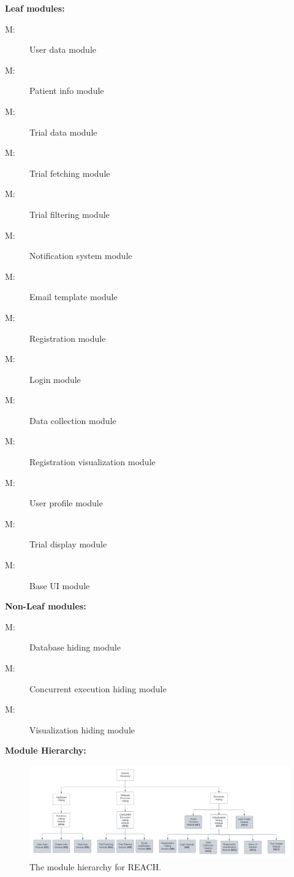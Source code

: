 \documentclass[12pt, titlepage]{article}
\newcounter{mnum}
\newcommand{\mthemnum}{M\themnum}
\begin{document}
\noindent \textbf{Leaf modules:}
\begin{description}
\item [ \mthemnum:] User data module
\item [ \mthemnum:] Patient info module
\item [ \mthemnum:] Trial data module
\item [ \mthemnum:] Trial fetching module
\item [ \mthemnum:] Trial filtering module
\item [ \mthemnum:] Notification system module
\item [ \mthemnum:] Email template module
\item [ \mthemnum:] Registration module
\item [ \mthemnum:] Login module
\item [ \mthemnum:] Data collection module
\item [ \mthemnum:] Registration visualization module
\item [ \mthemnum:] User profile module
\item [ \mthemnum:] Trial display module
\item [ \mthemnum:] Base UI module\\
\end{description}
\noindent \textbf{Non-Leaf modules:}
\begin{description} 
\item [ \mthemnum:] Database hiding module
\item [ \mthemnum:] Concurrent execution hiding module
\item [ \mthemnum:] Visualization hiding module\\
\end{description}

\noindent \textbf{Module Hierarchy:}

\begin{figure}[h]
  \includegraphics[scale=0.45]{module_hierarchy.png}
  \caption{The module hierarchy for REACH.}
  \label{FigMH}
\end{figure}
\end{document}
